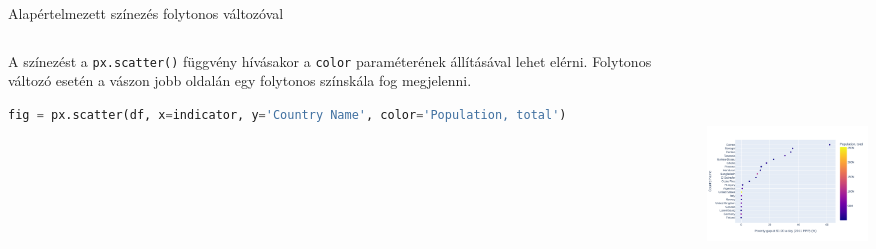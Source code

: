 \documentclass[english, aspectratio=169]{beamer}
\begin{document}
	\begin{frame}[fragile]{Alapértelmezett színezés folytonos változóval}
		\begin{columns}
			\begin{column}{.5\textwidth}
				A színezést a \texttt{px.scatter()} függvény hívásakor a \texttt{color} paraméterének állításával lehet elérni. Folytonos változó esetén a vászon jobb oldalán egy folytonos színskála fog megjelenni.\par\medskip
				\begin{lstlisting}[language=python]
fig = px.scatter(df, x=indicator, y='Country Name', color='Population, total')				
				\end{lstlisting}
			\end{column}
			\begin{column}{.5\textwidth}
				\begin{center}
					\includegraphics[width=7cm, height=7cm, keepaspectratio]{images/scatter_9.png}
				\end{center}
			\end{column}
		\end{columns}
	\end{frame}
	
\end{document}
